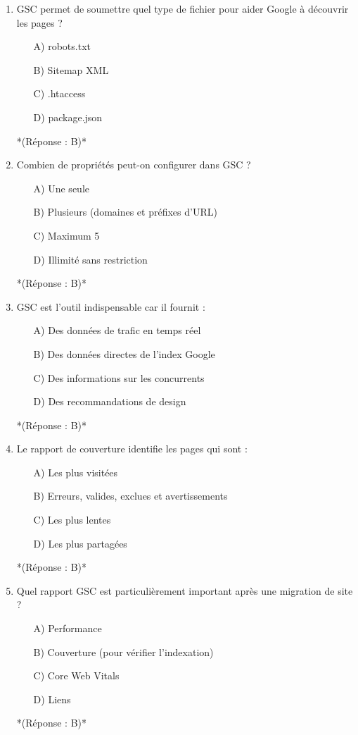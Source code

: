 \documentclass[12pt,a4paper,twoside]{report}
\begin{document}
\begin{enumerate}
    \item GSC permet de soumettre quel type de fichier pour aider Google à découvrir les pages ?
    \begin{itemize}
        \item[A)] robots.txt
        \item[B)] Sitemap XML
        \item[C)] .htaccess
        \item[D)] package.json
    \end{itemize}
    *(Réponse : B)*

    \item Combien de propriétés peut-on configurer dans GSC ?
    \begin{itemize}
        \item[A)] Une seule
        \item[B)] Plusieurs (domaines et préfixes d'URL)
        \item[C)] Maximum 5
        \item[D)] Illimité sans restriction
    \end{itemize}
    *(Réponse : B)*

    \item GSC est l'outil indispensable car il fournit :
    \begin{itemize}
        \item[A)] Des données de trafic en temps réel
        \item[B)] Des données directes de l'index Google
        \item[C)] Des informations sur les concurrents
        \item[D)] Des recommandations de design
    \end{itemize}
    *(Réponse : B)*

    \item Le rapport de couverture identifie les pages qui sont :
    \begin{itemize}
        \item[A)] Les plus visitées
        \item[B)] Erreurs, valides, exclues et avertissements
        \item[C)] Les plus lentes
        \item[D)] Les plus partagées
    \end{itemize}
    *(Réponse : B)*

    \item Quel rapport GSC est particulièrement important après une migration de site ?
    \begin{itemize}
        \item[A)] Performance
        \item[B)] Couverture (pour vérifier l'indexation)
        \item[C)] Core Web Vitals
        \item[D)] Liens
    \end{itemize}
    *(Réponse : B)*


\end{enumerate}
\end{document}
